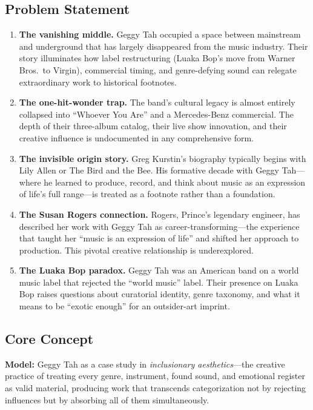 \documentclass[11pt,letterpaper]{article}
\begin{document}
\subsection{Problem Statement}

\begin{enumerate}[leftmargin=2em]
\item \textbf{The vanishing middle.} Geggy Tah occupied a space between mainstream and underground that has largely disappeared from the music industry. Their story illuminates how label restructuring (Luaka Bop's move from Warner Bros.\ to Virgin), commercial timing, and genre-defying sound can relegate extraordinary work to historical footnotes.

\item \textbf{The one-hit-wonder trap.} The band's cultural legacy is almost entirely collapsed into ``Whoever You Are'' and a Mercedes-Benz commercial. The depth of their three-album catalog, their live show innovation, and their creative influence is undocumented in any comprehensive form.

\item \textbf{The invisible origin story.} Greg Kurstin's biography typically begins with Lily Allen or The Bird and the Bee. His formative decade with Geggy Tah---where he learned to produce, record, and think about music as an expression of life's full range---is treated as a footnote rather than a foundation.

\item \textbf{The Susan Rogers connection.} Rogers, Prince's legendary engineer, has described her work with Geggy Tah as career-transforming---the experience that taught her ``music is an expression of life'' and shifted her approach to production. This pivotal creative relationship is underexplored.

\item \textbf{The Luaka Bop paradox.} Geggy Tah was an American band on a world music label that rejected the ``world music'' label. Their presence on Luaka Bop raises questions about curatorial identity, genre taxonomy, and what it means to be ``exotic enough'' for an outsider-art imprint.
\end{enumerate}

\subsection{Core Concept}

\begin{quotebox}
\textbf{Model:} Geggy Tah as a case study in \textit{inclusionary aesthetics}---the creative practice of treating every genre, instrument, found sound, and emotional register as valid material, producing work that transcends categorization not by rejecting influences but by absorbing all of them simultaneously.
\end{quotebox}
\end{document}
